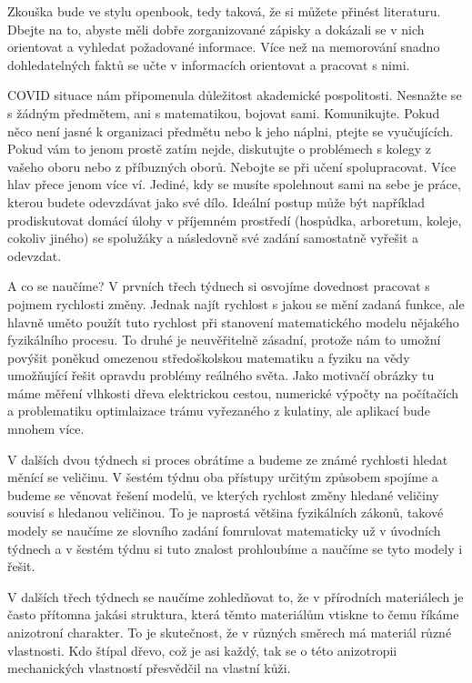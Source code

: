 \documentclass[12pt]{article}
\begin{document}
Zkouška bude ve stylu openbook, tedy taková, že si můžete přinést literaturu. Dbejte na to, abyste měli dobře zorganizované zápisky a dokázali se v nich orientovat a vyhledat požadované informace. Více než na memorování snadno dohledatelných faktů se učte v informacích orientovat a pracovat s nimi.

COVID situace nám připomenula důležitost akademické pospolitosti. Nesnažte se s žádným předmětem, ani s matematikou, bojovat sami. Komunikujte. Pokud něco není jasné k organizaci předmětu nebo  k jeho náplni, ptejte se vyučujících. Pokud vám to jenom prostě zatím nejde, diskutujte o problémech s kolegy z vašeho oboru nebo z příbuzných oborů. Nebojte se při učení spolupracovat. Více hlav přece jenom více ví. Jediné, kdy se musíte spolehnout sami na sebe je práce, kterou budete odevzdávat jako své dílo. Ideální postup může být například prodiskutovat domácí úlohy v příjemném prostředí (hospůdka, arboretum, koleje, cokoliv jiného) se spolužáky a následovně své zadání samostatně vyřešit a odevzdat.

A co se naučíme? V prvních třech týdnech si osvojíme dovednost pracovat s pojmem rychlosti změny. Jednak najít rychlost s jakou se mění zadaná funkce, ale hlavně uměto použít tuto rychlost při stanovení matematického modelu nějakého fyzikálního procesu. To druhé je neuvěřitelně zásadní, protože nám to umožní povýšit poněkud omezenou středoškolskou matematiku a fyziku na vědy umožňující řešit opravdu problémy reálného světa. Jako motivačí obrázky tu máme měření vlhkosti dřeva elektrickou cestou, numerické výpočty na počítačích a problematiku optimlaizace trámu vyřezaného z kulatiny, ale aplikací bude mnohem více.

V dalších dvou týdnech si proces obrátíme a budeme ze známé rychlosti hledat měnící se veličinu. V šestém týdnu  oba přístupy určitým způsobem spojíme a budeme se věnovat řešení modelů, ve kterých rychlost změny hledané veličiny souvisí s hledanou veličinou. To je naprostá většina fyzikálních zákonů, takové modely se naučíme ze slovního zadání fomrulovat matematicky už v úvodních týdnech a v šestém týdnu si tuto znalost prohloubíme a naučíme se tyto modely i řešit.

V dalších třech týdnech se naučíme zohledňovat to, že v přírodních materiálech je často přítomna jakási struktura, která těmto materiálům vtiskne to čemu říkáme anizotroní charakter. To je skutečnost, že v různých směrech má materiál různé vlastnosti. Kdo štípal dřevo, což je asi každý, tak se o této anizotropii mechanických vlastností přesvědčil na vlastní kůži.
\end{document}
